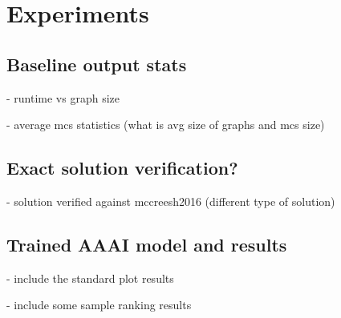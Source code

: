 \section{Experiments}
\subsection{Baseline output stats}
- runtime vs graph size

- average mcs statistics (what is avg size of graphs and mcs size)
\subsection{Exact solution verification?}
- solution verified against mccreesh2016 (different type of solution)
\subsection{Trained AAAI model and results}
- include the standard plot results

- include some sample ranking results
